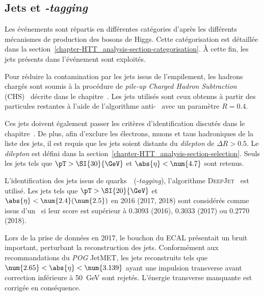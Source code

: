 \subsection{Jets et \emph{\quarkb-tagging}}\label{chapter-HTT_analysis-section-objects-jets}
Les événements sont répartis en différentes catégories d'après les différents mécanismes de production des bosons de Higgs.
Cette catégorisation est détaillée dans la section~\ref{chapter-HTT_analysis-section-categorisation}.
À cette fin, les jets présents dans l'événement sont exploités.
\par
Pour réduire la contamination par les jets issus de l'empilement, les hadrons chargés sont soumis à la procédure de \emph{pile-up Charged Hadron Subtraction} (CHS)~\cite{CMS-PAS-JME-14-001} décrite dans le chapitre~.
Les jets utilisés sont ceux obtenus à partir des particules restantes à l'aide de l'algorithme anti-\kT~\cite{Cacciari_antikT} avec un paramètre $R=\num{0.4}$.
\par
Ces jets doivent également passer les critères d'identification discutés dans le chapitre~.
De plus, afin d'exclure les électrons, muons et taus hadroniques de la liste des jets, il est requis que les jets soient distants du \emph{dilepton} de $\Delta R > \num{0.5}$.
Le \emph{dilepton} est défini dans la section~\ref{chapter-HTT_analysis-section-selection}.
Seuls les jets tels que $\pT > \SI{30}{\GeV}$ et $\abs{\eta}<\num{4.7}$ sont retenus.
\par
L'identification des jets issus de quarks~\quarkb\ (\quarkb-\emph{tagging}), l'algorithme \textsc{DeepJet}~\cite{DeepJet} est utilisé.
Les jets tels que $\pT > \SI{20}{\GeV}$ et $\abs{\eta}<\num{2.4} (\num{2.5})$ en 2016 (2017, 2018) sont considérés comme issus d'un \quarkb\ si leur score est supérieur à \num{0.3093} (2016), \num{0.3033} (2017) ou \num{0.2770} (2018).
\par
Lors de la prise de données en 2017, le bouchon du ECAL présentait un bruit important, perturbant la reconstruction des jets.
Conformément aux recommandations du \emph{POG} JetMET, les jets reconstruits tels que $\num{2.65} < \abs{\eta} < \num{3.139}$ ayant une impulsion transverse avant correction inférieure à \SI{50}{\GeV} sont rejetés.
L'énergie transverse manquante est corrigée en conséquence.